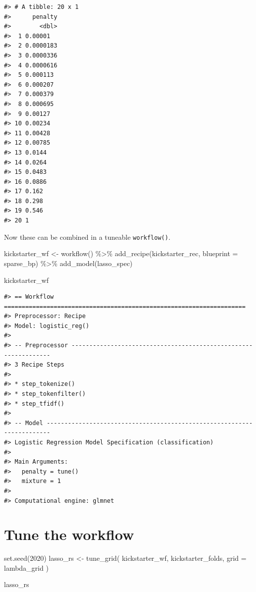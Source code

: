 \documentclass[
]{krantz}
\makeatletter
\newenvironment{Shaded}{\begin{snugshade}}{\end{snugshade}}
\newcommand{\AttributeTok}[1]{\textcolor[rgb]{0.77,0.63,0.00}{#1}}
\newcommand{\DecValTok}[1]{\textcolor[rgb]{0.00,0.00,0.81}{#1}}
\newcommand{\FunctionTok}[1]{\textcolor[rgb]{0.00,0.00,0.00}{#1}}
\newcommand{\NormalTok}[1]{#1}
\newcommand{\OtherTok}[1]{\textcolor[rgb]{0.56,0.35,0.01}{#1}}
\newcommand{\SpecialCharTok}[1]{\textcolor[rgb]{0.00,0.00,0.00}{#1}}
\newenvironment{kframe}{%
\medskip{}
\setlength{\fboxsep}{.8em}
 \def\at@end@of@kframe{}%
 \ifinner\ifhmode%
  \def\at@end@of@kframe{\end{minipage}}%
  \begin{minipage}{\columnwidth}%
 \fi\fi%
 \def\FrameCommand##1{\hskip\@totalleftmargin \hskip-\fboxsep
 \colorbox{shadecolor}{##1}\hskip-\fboxsep
     \hskip-\linewidth \hskip-\@totalleftmargin \hskip\columnwidth}%
 \MakeFramed {\advance\hsize-\width
   \@totalleftmargin\z@ \linewidth\hsize
   \@setminipage}}%
 {\par\unskip\endMakeFramed%
 \at@end@of@kframe}
\renewenvironment{Shaded}{\begin{kframe}}{\end{kframe}}
\makeatother
\begin{document}
\begin{verbatim}
#> # A tibble: 20 x 1
#>      penalty
#>        <dbl>
#>  1 0.00001  
#>  2 0.0000183
#>  3 0.0000336
#>  4 0.0000616
#>  5 0.000113 
#>  6 0.000207 
#>  7 0.000379 
#>  8 0.000695 
#>  9 0.00127  
#> 10 0.00234  
#> 11 0.00428  
#> 12 0.00785  
#> 13 0.0144   
#> 14 0.0264   
#> 15 0.0483   
#> 16 0.0886   
#> 17 0.162    
#> 18 0.298    
#> 19 0.546    
#> 20 1
\end{verbatim}

Now these can be combined in a tuneable \texttt{workflow()}.

\begin{Shaded}
\begin{Highlighting}[]
\NormalTok{kickstarter\_wf }\OtherTok{\textless{}{-}} \FunctionTok{workflow}\NormalTok{() }\SpecialCharTok{\%\textgreater{}\%}
  \FunctionTok{add\_recipe}\NormalTok{(kickstarter\_rec, }\AttributeTok{blueprint =}\NormalTok{ sparse\_bp) }\SpecialCharTok{\%\textgreater{}\%}
  \FunctionTok{add\_model}\NormalTok{(lasso\_spec)}

\NormalTok{kickstarter\_wf}
\end{Highlighting}
\end{Shaded}

\begin{verbatim}
#> == Workflow ====================================================================
#> Preprocessor: Recipe
#> Model: logistic_reg()
#> 
#> -- Preprocessor ----------------------------------------------------------------
#> 3 Recipe Steps
#> 
#> * step_tokenize()
#> * step_tokenfilter()
#> * step_tfidf()
#> 
#> -- Model -----------------------------------------------------------------------
#> Logistic Regression Model Specification (classification)
#> 
#> Main Arguments:
#>   penalty = tune()
#>   mixture = 1
#> 
#> Computational engine: glmnet
\end{verbatim}

\hypertarget{tune-the-workflow}{%
\section{Tune the workflow}\label{tune-the-workflow}}

\begin{Shaded}
\begin{Highlighting}[]
\FunctionTok{set.seed}\NormalTok{(}\DecValTok{2020}\NormalTok{)}
\NormalTok{lasso\_rs }\OtherTok{\textless{}{-}} \FunctionTok{tune\_grid}\NormalTok{(}
\NormalTok{  kickstarter\_wf,}
\NormalTok{  kickstarter\_folds,}
  \AttributeTok{grid =}\NormalTok{ lambda\_grid}
\NormalTok{)}

\NormalTok{lasso\_rs}
\end{Highlighting}
\end{Shaded}
\end{document}
